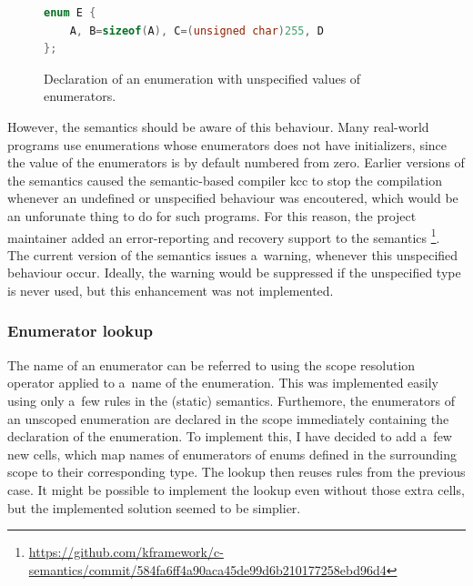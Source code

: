 \documentclass{fithesis3}
\begin{document}
\begin{figure}[ht]
\begin{lstlisting}[language=C++]
enum E {
	A, B=sizeof(A), C=(unsigned char)255, D
};
\end{lstlisting}
\caption{Declaration of an enumeration with unspecified values of enumerators.}
\label{fig:ugly-enum}
\end{figure}

However, the semantics should be aware of this behaviour. Many real-world programs use enumerations whose enumerators does not have initializers, since the value of the enumerators is by default numbered from zero. Earlier versions of the semantics caused the semantic-based compiler kcc to stop the compilation whenever an undefined or unspecified behaviour was encoutered, which would be an unforunate thing to do for such programs. For this reason, the project maintainer added an error-reporting and recovery support to the semantics \footnote{\url{https://github.com/kframework/c-semantics/commit/584fa6ff4a90aca45de99d6b210177258ebd96d4}}. The current version of the semantics issues a~warning, whenever this unspecified behaviour occur. Ideally, the warning would be suppressed if the unspecified type is never used, but this enhancement was not implemented.



\subsubsection{Enumerator lookup}

The name of an enumerator can be referred to using the scope resolution operator applied to a~name of the enumeration. This was implemented easily using only a~few rules in the (static) semantics.
Furthemore, the enumerators of an unscoped enumeration are declared in the scope immediately containing the declaration of the enumeration. To implement this, I have decided to add a~few new cells, which map names of enumerators of enums defined in the surrounding scope to their corresponding type. The lookup then reuses rules from the previous case. It might be possible to implement the lookup even without those extra cells, but the implemented solution seemed to be simplier.
\end{document}
